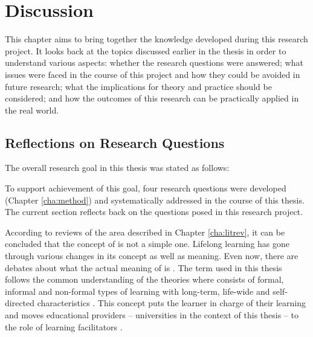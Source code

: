 \chapter{Discussion\label{cha:discussion}}
This chapter aims to bring together the knowledge developed during this research
project. It looks back at the topics discussed earlier in the thesis in order to
understand various aspects: whether the research questions were answered; what
issues were faced in the course of this project and how they could be avoided in
future research; what the implications for theory and practice should be
considered; and how the outcomes of this research can be practically applied
in the real world.

\section{Reflections on Research Questions}

The overall research goal in this thesis was stated as follows:


To support achievement of this goal, four research questions were developed
(Chapter \ref{cha:method}) and systematically addressed in the course of this
thesis. The current section reflects back on the questions posed in this
research project.


According to reviews of the area described in Chapter \ref{cha:litrev}, it
can be concluded that the concept of \LLLs is not a simple one. Lifelong
learning has gone through various changes in its concept as well as meaning.
Even now, there are debates about what the actual meaning of \LLLs is
\citep{Griffin2002}. The term used in this thesis follows the common
understanding of the theories where \LLLs consists of formal, informal and
non-formal types of learning with long-term, life-wide and self-directed
characteristics \citep{Longworth2003,Rubenson2002,Schuetze2006}. This concept
puts the learner in charge of their learning and moves educational providers --
universities in the context of this thesis -- to the role of learning
facilitators \citep{Boshier2000}.

